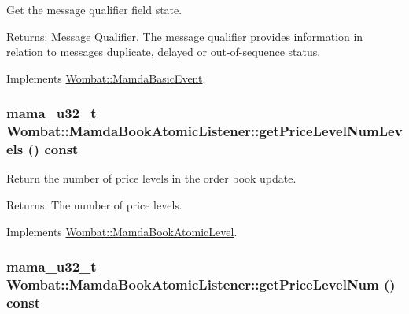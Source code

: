 Get the message qualifier field state. 

\begin{Desc}
\item[Returns:]Message Qualifier. The message qualifier provides information in relation to messages duplicate, delayed or out-of-sequence status. \end{Desc}


Implements \hyperlink{classWombat_1_1MamdaBasicEvent_3454d51e1131d9949691ee4b4153cd97}{Wombat::Mamda\-Basic\-Event}.\hypertarget{classWombat_1_1MamdaBookAtomicListener_b7b3fe18e82667b4ab2db1b10c535b30}{
\subsubsection[getPriceLevelNumLevels]{\setlength{\rightskip}{0pt plus 5cm}mama\_\-u32\_\-t Wombat::Mamda\-Book\-Atomic\-Listener::get\-Price\-Level\-Num\-Levels () const}}
\label{classWombat_1_1MamdaBookAtomicListener_b7b3fe18e82667b4ab2db1b10c535b30}


Return the number of price levels in the order book update. 

\begin{Desc}
\item[Returns:]The number of price levels. \end{Desc}


Implements \hyperlink{classWombat_1_1MamdaBookAtomicLevel_9b93f1c575fa54e72ce1da2d81034bb7}{Wombat::Mamda\-Book\-Atomic\-Level}.\hypertarget{classWombat_1_1MamdaBookAtomicListener_0e9aca6717995e413ba7038d38be5f63}{
\subsubsection[getPriceLevelNum]{\setlength{\rightskip}{0pt plus 5cm}mama\_\-u32\_\-t Wombat::Mamda\-Book\-Atomic\-Listener::get\-Price\-Level\-Num () const}}
\label{classWombat_1_1MamdaBookAtomicListener_0e9aca6717995e413ba7038d38be5f63}


